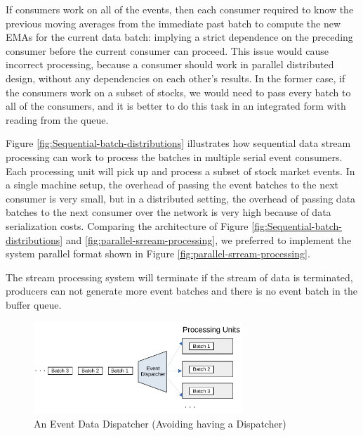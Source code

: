 If consumers work on all of the events, then each consumer required to know the previous moving averages from the immediate past batch to compute the new EMAs for 
the current data batch: implying a strict dependence on the preceding consumer before the current consumer can proceed. This issue would cause incorrect processing, because a consumer should work in parallel distributed design, without any dependencies on each other's results. In the former case, if the consumers work on a subset of stocks, we would need to pass every batch to all 
of the consumers, and it is better to do this task in an integrated form with reading from the queue.


Figure \ref{fig:Sequential-batch-distributions} illustrates how sequential data stream processing can work to process the batches in multiple
serial event consumers. Each processing unit will pick up and process a subset of stock market events.
In a single machine setup, the overhead of passing the event batches to the next consumer is very small, but in a distributed setting, the
overhead of passing data batches to the next consumer over the network is very high because of data serialization costs. Comparing the
architecture of Figure \ref{fig:Sequential-batch-distributions} and \ref{fig:parallel-srream-processing}, we preferred to implement the system
parallel format shown in Figure \ref{fig:parallel-srream-processing}.


The stream processing system will terminate if the stream of data is terminated, producers can not generate more event batches
and there is no event batch in the buffer queue.



\begin{figure}[!h]
    \begin{center}
        \includegraphics[width=0.7\textwidth]{./images/Stream-Batch-Distributions}
        \caption{An Event Data Dispatcher (Avoiding having a Dispatcher)}
        \label{fig:batch-distributions}
    \end{center}
\end{figure}

